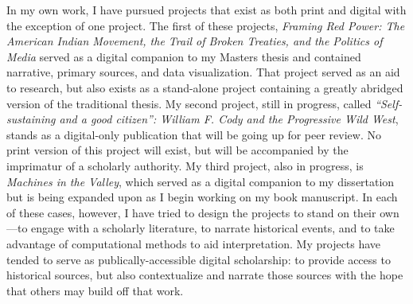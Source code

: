 \documentclass[11pt,]{article}
\begin{document}
In my own work, I have pursued projects that exist as both print and
digital with the exception of one project. The first of these projects,
\emph{Framing Red Power: The American Indian Movement, the Trail of
Broken Treaties, and the Politics of Media} served as a digital
companion to my Masters thesis and contained narrative, primary sources,
and data visualization. That project served as an aid to research, but
also exists as a stand-alone project containing a greatly abridged
version of the traditional thesis. My second project, still in progress,
called \emph{``Self-sustaining and a good citizen'': William F. Cody and
the Progressive Wild West}, stands as a digital-only publication that
will be going up for peer review. No print version of this project will
exist, but will be accompanied by the imprimatur of a scholarly
authority. My third project, also in progress, is \emph{Machines in the
Valley}, which served as a digital companion to my dissertation but is
being expanded upon as I begin working on my book manuscript. In each of
these cases, however, I have tried to design the projects to stand on
their own---to engage with a scholarly literature, to narrate historical
events, and to take advantage of computational methods to aid
interpretation. My projects have tended to serve as
publically-accessible digital scholarship: to provide access to
historical sources, but also contextualize and narrate those sources
with the hope that others may build off that work.


\newpage
\singlespacing 
\end{document}
